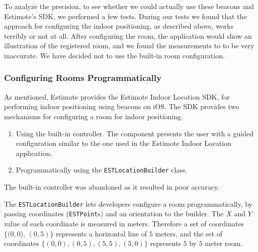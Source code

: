 To analyze the precision, 
to see whether we could actually use these beacons and Estimote's SDK, 
we performed a few tests. 
During our tests we found that the approach for configuring the indoor positioning, 
as described above, works terribly or not at all. 
After configuring the room, 
the application would show an illustration of the registered room, 
and we found the measurements to to be very inaccurate.
We have decided not to use the built-in room configuration. 

\subsubsection{Configuring Rooms Programmatically}
As mentioned, Estimote provides the Estimote Indoor Location SDK, 
for performing indoor positioning using beacons on iOS. 
The SDK provides two mechanisms for configuring a room for indoor positioning.

\begin{enumerate}
\item Using the built-in controller. The component presents the user with a guided configuration similar to the one used in the Estimote Indoor Location application.
\item Programmatically using the \texttt{ESTLocationBuilder} class.
\end{enumerate}

The built-in controller was abandoned as it resulted in poor accuracy.

The \texttt{ESTLocationBuilder} lets developers configure a room programmatically, 
by passing coordinates (\texttt{ESTPoint}s) and an orientation to the builder. 
The $X$ and $Y$ value of each coordinate is measured in meters. 
Therefore a set of coordinates $\{(0, 0$), $(0, 5)\}$ represents a horizontal line of $5$ meters, 
and the set of coordinates $\{(0,0),(0,5),(5,5),(5,0)\}$ represents $5$ by $5$ meter room.


